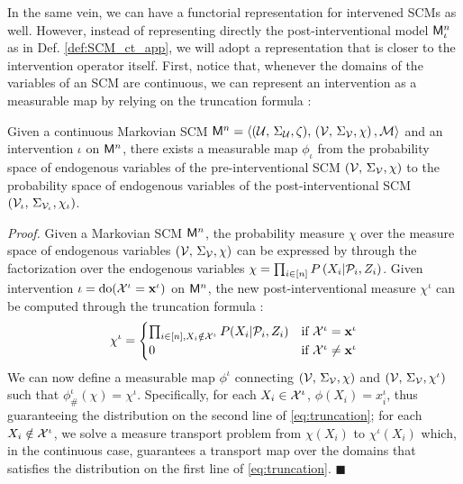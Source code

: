 In the same vein, we can have a functorial representation for intervened SCMs as well. However, instead of representing directly the post-interventional model $\mathsf{M}^n_\iota$ as in Def. \ref{def:SCM_ct_app}, we will adopt a representation that is closer to the intervention operator itself. First, notice that, whenever the domains of the variables of an SCM are continuous, we can represent an intervention as a measurable map by relying on the truncation formula :
\begin{lemma}
    Given a continuous Markovian  SCM $\mathsf{M}^n = \langle (\mathcal{U},\, \Sigma_{\mathcal{U}}, \zeta), \, (\mathcal{V},\, \Sigma_{\mathcal{V}}, \chi)\, , \mathcal{M} \rangle$ and an intervention $\iota$ on $\mathsf{M}^n$, there exists a measurable map $\phi_\iota$ from the probability space of endogenous variables of the pre-interventional SCM $(\mathcal{V},\, \Sigma_{\mathcal{V}}, \chi)$ to the probability space of endogenous variables of the post-interventional SCM $(\mathcal{V}_\iota,\, \Sigma_{\mathcal{V}_\iota}, \chi_\iota)$.
\end{lemma}
\emph{Proof.} Given a Markovian SCM $\mathsf{M}^n$, the probability measure $\chi$ over the measure space of endogenous variables $(\mathcal{V},\, \Sigma_{\mathcal{V}}, \chi)$ can be expressed by through the factorization over the endogenous variables $\chi=\prod_{i \in [n]} P\left(X_i |  \mathcal{P}_i,Z_i\right)$.  Given intervention $\iota=\operatorname{do}(\mathcal{X}^{\iota} = \mathbf{x}^{\iota})$ on $\mathsf{M}^n$, the new post-interventional measure $\chi^\iota$ can be computed through the truncation formula :
\begin{equation}\label{eq:truncation}
\chi^{\iota}=\begin{cases}
\prod_{i\in[n],X_{i}\notin \mathcal{X}^{\iota}}P(X_i|\mathcal{P}_i,Z_i) & \textrm{if }\mathcal{X}^{\iota} = \mathbf{x}^{\iota}\\
0 & \textrm{if }\mathcal{X}^{\iota} \neq \mathbf{x}^{\iota}
\end{cases}
\end{equation}
We can now define a measurable map $\phi^\iota$ connecting $(\mathcal{V},\, \Sigma_{\mathcal{V}}, \chi)$ and $(\mathcal{V},\, \Sigma_{\mathcal{V}}, \chi^\iota)$ such that $\phi^\iota_{\#}(\chi)=\chi^\iota$. Specifically, for each $X_i \in \mathcal{X}^{\iota}$, $\phi(X_i) = x_i^\iota$, thus guaranteeing the distribution on the second line of \cref{eq:truncation}; for each $X_i \notin \mathcal{X}^{\iota}$, we solve a measure transport problem  from $\chi(X_i)$ to $\chi^\iota(X_i)$ which, in the continuous case, guarantees a transport map over the domains that satisfies the distribution on the first line of \cref{eq:truncation}.
$\blacksquare$

